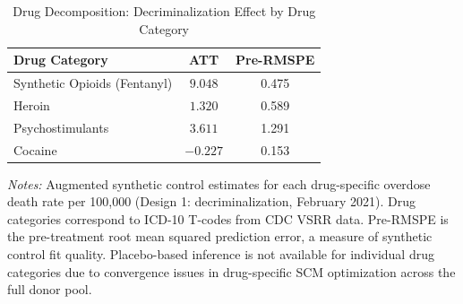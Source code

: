 \begin{table}[H]
\centering
\caption{Drug Decomposition: Decriminalization Effect by Drug Category}
\label{tab:decomp}
\begin{threeparttable}
\begin{tabular}{lcc}
\toprule
Drug Category & ATT & Pre-RMSPE \\
\midrule
Synthetic Opioids (Fentanyl) & $9.048$ & 0.475 \\
Heroin & $1.320$ & 0.589 \\
Psychostimulants & $3.611$ & 1.291 \\
Cocaine & $-0.227$ & 0.153 \\
\bottomrule
\end{tabular}
\begin{tablenotes}[flushleft]
\small
\item \textit{Notes:} Augmented synthetic control estimates for each drug-specific overdose death rate per 100,000 (Design 1: decriminalization, February 2021). Drug categories correspond to ICD-10 T-codes from CDC VSRR data. Pre-RMSPE is the pre-treatment root mean squared prediction error, a measure of synthetic control fit quality. Placebo-based inference is not available for individual drug categories due to convergence issues in drug-specific SCM optimization across the full donor pool.
\end{tablenotes}
\end{threeparttable}
\end{table}
